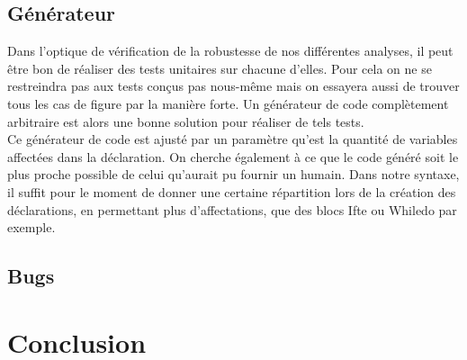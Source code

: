 \documentclass[a4paper, 10pt]{article}
\begin{document}
\subsection{Générateur}
Dans l'optique de vérification de la robustesse de nos différentes analyses, il peut être bon de réaliser
des tests unitaires sur chacune d'elles. Pour cela on ne se restreindra pas aux tests conçus pas nous-même
mais on essayera aussi de trouver tous les cas de figure par la manière forte. Un générateur de code complètement
arbitraire est alors une bonne solution pour réaliser de tels tests.
\\
Ce générateur de code est ajusté par un paramètre qu'est la quantité de variables affectées dans la déclaration. On
cherche également à ce que le code généré soit le plus proche possible de celui qu'aurait pu fournir un humain.
Dans notre syntaxe, il suffit pour le moment de donner une certaine répartition lors de la création des déclarations,
en permettant plus d'affectations, que des blocs Ifte ou Whiledo par exemple.
\subsection{Bugs}
\section{Conclusion}
\end{document}
